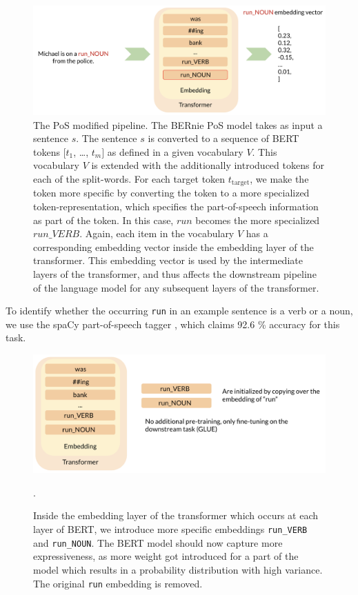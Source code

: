 \documentclass[a4paper,12pt,twoside,openright]{report}
\begin{document}
\begin{figure}[H]
	\center
  \includegraphics[width=\linewidth]{./assets/experiments/pipeline_tokenizer_BERnie_POS_input.png}
  \caption{The PoS modified pipeline. 
  The BERnie PoS model takes as input a sentence $s$. The sentence $s$ is converted to a sequence of BERT tokens $[t_1$, \ldots, $t_m]$ as defined in a given vocabulary $V$.
    This vocabulary $V$ is extended with the additionally introduced tokens for each of the split-words.
For each target token $t_{\text{target}}$, we make the token more specific by converting the token to a more specialized token-representation, which specifies the part-of-speech information as part of the token.
In this case, $run$ becomes the more specialized $run\_ VERB$.
Again, each item in the vocabulary $V$ has a corresponding embedding vector inside the embedding layer of the transformer.
This embedding vector is used by the intermediate layers of the transformer, and thus affects the downstream pipeline of the language model for any subsequent layers of the transformer.
}
  \label{fig:BERnie_POS_pipeline}
\end{figure}


To identify whether the occurring \Verb#run# in an example sentence is a verb or a noun, we use the spaCy part-of-speech tagger \cite{spacyb}, which claims 92.6 \% accuracy for this task.

\begin{figure}[H]
	\center
  \includegraphics[width=\linewidth]{./assets/experiments/pipeline_model_BERnie_POS_initialization.png}
  \caption{Inside the embedding layer of the transformer which occurs at each layer of BERT, we introduce more specific embeddings \texttt{run\_VERB} and \texttt{run\_NOUN}. The BERT model should now capture more expressiveness, as more weight got introduced for a part of the model which results in a probability distribution with high variance. The original \texttt{run} embedding is removed.}.
  \label{fig:BERnie_POS_initialization}
\end{figure}
\end{document}
